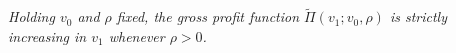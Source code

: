 \textit{Holding $v_0$ and $\rho$ fixed, the gross profit function $\tilde{\Pi}(v_1; v_0, \rho)$ is strictly increasing in $v_1$ whenever $\rho > 0$.}
